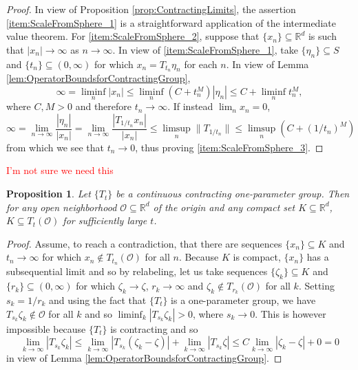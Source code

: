 \documentclass[11pt]{article}
\newtheorem{proposition}[theorem]{Proposition}
\begin{document}
\begin{proof}
In view of Proposition \ref{prop:ContractingLimits}, the assertion \ref{item:ScaleFromSphere_1} is a straightforward application of the intermediate value theorem. For \ref{item:ScaleFromSphere_2}, suppose that $\{x_n\}\subseteq\mathbb{R}^d$ is such that $|x_n|\rightarrow \infty$ as $n\rightarrow\infty$. In view of \ref{item:ScaleFromSphere_1}, take $\{\eta_n\}\subseteq S$ and $\{t_n\}\subseteq (0,\infty)$ for which $x_n=T_{t_n}\eta_n$ for each $n$. In view of Lemma \ref{lem:OperatorBoundsforContractingGroup},
\begin{equation*}
\infty=\liminf_n |x_n|\leq\liminf_n \left(C+t_n^M\right)|\eta_n|\leq C+\liminf_nt_n^M,
\end{equation*}
where $C,M>0$ and therefore $t_n\rightarrow\infty$. If instead $\lim_n x_n=0$,
\begin{equation*}
\infty=\lim_{n\rightarrow\infty}\frac{|\eta_n|}{|x_n|}=\lim_{n\rightarrow\infty}\frac{|T_{1/t_n}x_n|}{|x_n|}\leq\limsup_n\|T_{1/t_n}\|\leq\limsup_n(C+(1/t_n)^M)
\end{equation*}
from which we see that $t_n\rightarrow 0$, thus proving \ref{item:ScaleFromSphere_3}.
\end{proof}

\textcolor{red}{I'm not sure we need this}
\begin{proposition}\label{prop:ContractingCapturesCompact}
Let $\{T_t\}$ be a continuous contracting one-parameter group. Then for any open neighborhood $\mathcal{O}\subseteq\mathbb{R}^d$ of the origin and any compact set $K\subseteq\mathbb{R}^d$, $K\subseteq T_t(\mathcal{O})$ for sufficiently large $t$.
\end{proposition}
\begin{proof}
Assume, to reach a contradiction, that there are sequences $\{x_n\}\subseteq K$ and $t_n\rightarrow\infty$ for which $x_n\notin T_{t_n}(\mathcal{O})$ for all $n$. Because $K$ is compact, $\{x_n\}$ has a subsequential limit and so by relabeling, let us take sequences $\{\zeta_k\}\subseteq K$ and $\{r_k\}\subseteq (0,\infty)$ for which $\zeta_k\rightarrow \zeta$, $r_k\rightarrow\infty$ and $\zeta_k\notin T_{r_k}(\mathcal{O})$ for all $k$. Setting $s_k=1/r_k$ and using the fact that $\{T_t\}$ is a one-parameter group, we have $T_{s_k}\zeta_k\notin\mathcal{O}$ for all $k$ and so $\liminf_{k}|T_{s_k}\zeta_k|>0$, where $s_k\rightarrow 0$. This is however impossible because $\{T_t\}$ is contracting and so
\begin{equation*}
\lim_{k\rightarrow\infty}|T_{s_k}\zeta_k|\leq\lim_{k\rightarrow \infty}|T_{s_k}(\zeta_k-\zeta)|+\lim_{k\rightarrow\infty}|T_{s_k}\zeta|\leq C\lim_{k\rightarrow\infty}|\zeta_k-\zeta|+0=0
\end{equation*}
in view of Lemma \ref{lem:OperatorBoundsforContractingGroup}.
\end{proof}
\end{document}
